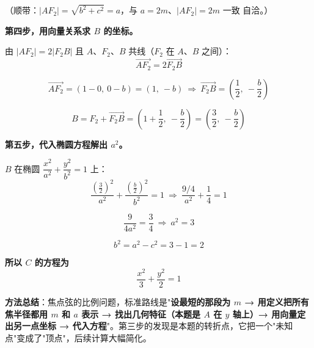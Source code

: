 \begin{answer}
（顺带：$\left|AF_2\right|=\sqrt{b^{2}+c^{2}}=a$，与 $a=2m$、$\left|AF_2\right|=2m$ 一致  自洽。）

\textbf{第四步，用向量关系求 $B$ 的坐标。}

由 $\left|AF_2\right|=2\left|F_2B\right|$ 且 $A$、$F_2$、$B$ 共线（$F_2$ 在 $A$、$B$ 之间）：
\nopagebreak[4]
\[\overrightarrow{AF_2}=2\overrightarrow{F_2B}\]

\nopagebreak[4]
\[\overrightarrow{AF_2}=(1-0,\ 0-b)=(1,\ -b)\ \Longrightarrow\ \overrightarrow{F_2B}=\left(\frac12,\ -\frac b2\right)\]

\nopagebreak[4]
\[B=F_2+\overrightarrow{F_2B}=\left(1+\frac12,\ -\frac b2\right)=\left(\frac32,\ -\frac b2\right)\]

\textbf{第五步，代入椭圆方程解出 $a^{2}$。}

$B$ 在椭圆 $\dfrac{x^{2}}{a^{2}}+\dfrac{y^{2}}{b^{2}}=1$ 上：
\nopagebreak[4]
\[\frac{\left(\frac32\right)^{2}}{a^{2}}+\frac{\left(\frac b2\right)^{2}}{b^{2}}=1\ \Longrightarrow\ \frac{9/4}{a^{2}}+\frac14=1\]

\nopagebreak[4]
\[\frac9{4a^{2}}=\frac34\ \Longrightarrow\ a^{2}=3\]

\nopagebreak[4]
\[b^{2}=a^{2}-c^{2}=3-1=2\]

\textbf{所以 $C$ 的方程为}
\nopagebreak[4]
\[\frac{x^{2}}3+\frac{y^{2}}2=1\]

\begin{gktip}
\textbf{方法总结}：焦点弦的比例问题，标准路线是"\textbf{设最短的那段为 $m$ → 用定义把所有焦半径都用 $m$ 和 $a$ 表示 → 找出几何特征（本题是 $A$ 在 $y$ 轴上）→ 用向量定出另一点坐标 → 代入方程}"。第三步的发现是本题的转折点，它把一个"未知点"变成了"顶点"，后续计算大幅简化。
\end{gktip}


\par\medskip

\end{answer}
